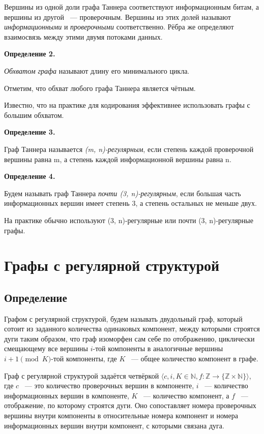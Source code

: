 \documentclass[14pt]{mmcs_article}
\begin{document}
Вершины из одной доли графа Таннера соответствуют информационным битам, а вершины из другой ~--- проверочным. Вершины из этих долей называют \textsl{информационными} и \textsl{проверочными} соответственно. Рёбра же определяют взаимосвязь между этими двумя потоками данных.

\textbf{Определение 2.}

\textsl{Обхватом графа} называют длину его минимального цикла.

Отметим, что обхват любого графа Таннера является чётным.

Известно, что на практике для кодирования эффективнее использовать графы с большим обхватом.

\textbf{Определение 3.}

Граф Таннера называется \textsl{(m, n)-регулярным}, если степень каждой проверочной вершины равна m, а степень каждой информационной вершины равна n.

\textbf{Определение 4.}

Будем называть граф Таннера \textsl{почти (3, n)-регулярным}, если большая часть информационных вершин имеет степень 3, а степень остальных не меньше двух.

На практике обычно используют (3, n)-регулярные или почти (3, n)-регулярные графы.

\newpage
\section{Графы с регулярной структурой}

\subsection{Определение}

Графом с регулярной структурой, будем называть двудольный граф, который сотоит из заданного количества одинаковых компонент, между которыми строятся дуги таким образом, что граф изоморфен сам себе по отображению, циклически смещающему все вершины $i$-той компоненты в аналогичные вершины $i + 1 \pmod K$-той компоненты, где $K$ ~--- общее количество компонент в графе.

Граф с регулярной структурой задаётся четвёркой $\langle c, i, K \in \mathbb{N}, f: \mathbb{Z} \rightarrow \{ \mathbb{Z} \times \mathbb{N} \} \rangle$, где $c$ ~--- это количество проверочных вершин в компоненте, $i$ ~--- количество информационных вершин в компоненте, $K$ ~--- количество компонент, а $f$ ~--- отображение, по которому строятся дуги. Оно сопоставляет номера проверочных вершины внутри компоненты в относительные номера компонент и номера информационных вершин внутри компонент, с которыми связана дуга.
\end{document}

